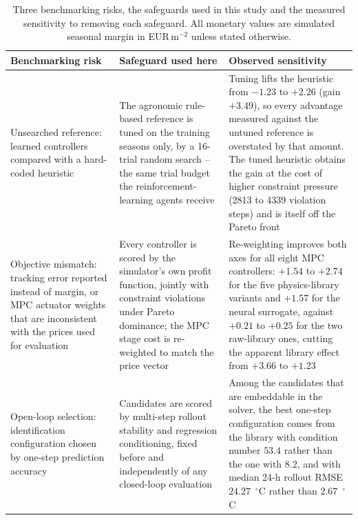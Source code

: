\begin{table}[htbp]
\centering
\caption{Three benchmarking risks, the safeguards used in this study and the measured
sensitivity to removing each safeguard. All monetary values are simulated seasonal margin
in EUR\,m$^{-2}$ unless stated otherwise.}
\label{tab:defects}
\begin{tabular}{p{}p{}p{}}
\toprule
\textbf{Benchmarking risk} & \textbf{Safeguard used here} & \textbf{Observed sensitivity} \\
\midrule
Unsearched reference: learned controllers compared with a hard-coded heuristic &
The agronomic rule-based reference is tuned on the training seasons only, by a 16-trial
random search -- the same trial budget the reinforcement-learning agents receive &
Tuning lifts the heuristic from $-1.23$ to $+2.26$ (gain $+3.49$), so every advantage
measured against the untuned reference is overstated by that amount. The tuned heuristic
obtains the gain at the cost of higher constraint pressure (2813 to 4339 violation steps)
and is itself off the Pareto front \\
\addlinespace
Objective mismatch: tracking error reported instead of margin, or MPC actuator weights
that are inconsistent with the prices used for evaluation &
Every controller is scored by the simulator's own profit function, jointly with
constraint violations under Pareto dominance; the MPC stage cost is re-weighted to match
the price vector &
Re-weighting improves both axes for all eight MPC controllers: $+1.54$ to $+2.74$ for the
five physics-library variants and $+1.57$ for the neural surrogate, against $+0.21$ to
$+0.25$ for the two raw-library ones, cutting the apparent library effect from $+3.66$ to
$+1.23$ \\
\addlinespace
Open-loop selection: identification configuration chosen by one-step prediction accuracy &
Candidates are scored by multi-step rollout stability and regression conditioning, fixed
before and independently of any closed-loop evaluation &
Among the candidates that are embeddable in the solver, the best one-step configuration
comes from the library with condition number $53.4$ rather than the one with $8.2$, and
with median 24-h rollout RMSE $24.27$~$^\circ$C rather than $2.67$~$^\circ$C \\
\bottomrule
\end{tabular}
\end{table}
